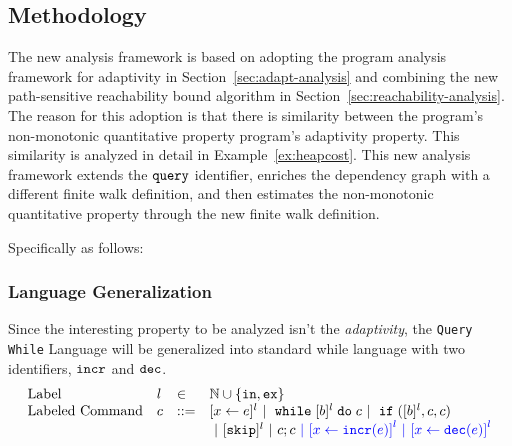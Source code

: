 \subsection{Methodology }
\label{sec:nonmonotonic-methodology}
The new analysis framework is based on adopting the program analysis framework for adaptivity in Section~\ref{sec:adapt-analysis} and combining the new path-sensitive reachability bound algorithm in Section~\ref{sec:reachability-analysis}.
The reason for this adoption is that there is 
similarity between the program's non-monotonic quantitative property
program's adaptivity property. This similarity is analyzed in detail in Example~\ref{ex:heapcost}.
This new analysis framework extends the  ${\tt query}$ identifier,
enriches the dependency graph with a different finite walk definition, and then estimates
the non-monotonic quantitative property through the new finite walk definition.

Specifically as follows:
\subsubsection{Language Generalization} Since the interesting property 
to be analyzed isn't the \emph{adaptivity},
the {\tt Query While} Language will be generalized into standard while language with two identifiers, $\mathtt{incr}$ and $\mathtt{dec}$.
\[
\begin{array}{llll}
\mbox{Label} 
& l & \in & \mathbb{N} \cup \{\lin, \lex\} \\
\mbox{Labeled Command} 
& {c} & ::= & [\assign {{x}}{ {\expr}}]^{l} 
~|~ {\ewhile [ \bexpr ]^{l} \edo {c} }
~|~ \eif([\bexpr]{}^l , {c}, {c})
 \\
 &&&
 ~|~ [\eskip]^l ~|~ {c};{c} 
\highlight{~|~ \clabel{\assign {{x} }{{\alloc(\expr)}}}^{l} ~|~ \clabel{\assign {{x} }{{\release(\expr)}}}^{l}}
\end{array}
\]
